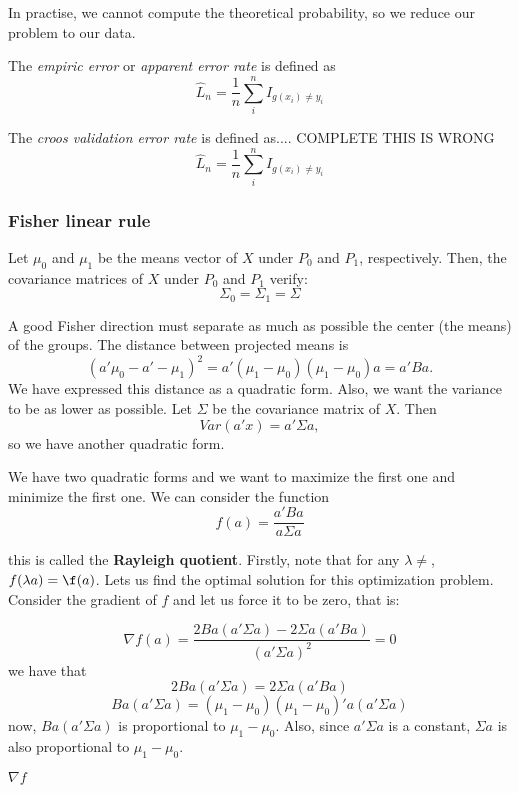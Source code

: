           In practise, we cannot compute the theoretical probability, so we reduce our problem to our data.

          \begin{ndef}
            The \emph{empiric error} or \emph{apparent error rate} is defined as
            \[
              \hat L_{n} = \frac{1}{n} \sum_{i}^{n} I_{g(x_{i}) \neq y_{i}}
            \]
          \end{ndef}
          \begin{ndef}
            The \emph{croos validation error rate} is defined as.... COMPLETE THIS IS WRONG
            \[
              \hat L_{n} = \frac{1}{n} \sum_{i}^{n} I_{g(x_{i}) \neq y_{i}}
            \]
          \end{ndef}


          \subsubsection{Fisher linear rule}

          \begin{nprop}

            Let $\mu_{0}$ and $\mu_{1}$ be the means vector of $X$ under \(P_{0}\) and \(P_{1}\), respectively. Then, the covariance matrices of \(X\) under \(P_{0}\) and \(P_{1}\) verify:
            \[
              \Sigma_{0} = \Sigma_{1} = \Sigma
            \]

          \end{nprop}

          A good Fisher direction must separate as much as possible the center (the means) of the groups. The distance between projected means is
          \[
            (a'\mu_{0} -a' - \mu_{1})^2 = a' (\mu_{1} - \mu_{0})(\mu_{1} - \mu_{0}) a=  a'Ba.
          \]
          We have expressed this distance as a quadratic form. Also, we want the variance to be as lower as possible. Let \(\Sigma\) be the covariance matrix of \(X\). Then
          \[
            Var(a'x) = a' \Sigma a,
          \]
          so we have another quadratic form.

          We have two quadratic forms and we want to maximize the first one and minimize the first one. We can consider the function
          \[
            f(a) = \frac{a'Ba}{a\Sigma a}
          \]

          this is called the \textbf{Rayleigh quotient}. Firstly, note that for any \(\lambda \neq \), \(f(\lambda a) = \f(a)\). Lets us find the optimal solution for this optimization problem. Consider the gradient of \(f\) and let us force it to be zero, that is:

          \[
            \nabla f(a) = \frac{2Ba (a' \Sigma a) - 2\Sigma a (a'Ba)}{(a'\Sigma a)^2} = 0
          \]
          we have that
          \[
            2Ba(a'\Sigma a) = 2\Sigma a(a'Ba)
          \]
          \[
            Ba(a'\Sigma a) = (\mu_{1} - \mu_{0})(\mu_{1} - \mu_{0})' a (a' \Sigma a)
          \]
          now, \(Ba (a'\Sigma a)\) is proportional to \(\mu_{1} - \mu_{0}\). Also, since \(a'\Sigma a\) is a constant, \(\Sigma a\) is also proportional to \(\mu_{1} - \mu_{0}\).

          \(\nabla f\)
